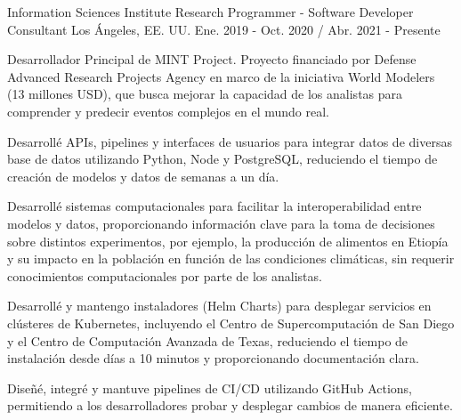 \begin{cventries}

  \cventry
    {Information Sciences Institute}
    {Research Programmer - Software Developer Consultant}
    {Los Ángeles, EE. UU.}
    {Ene. 2019 - Oct. 2020 / Abr. 2021 - Presente}
    {
      \begin{cvitems}
        \item{Desarrollador Principal de MINT Project. Proyecto financiado por Defense Advanced Research Projects Agency en marco de la iniciativa World Modelers (13 millones USD), que busca mejorar la capacidad de los analistas para comprender y predecir eventos complejos en el mundo real.}
        \item{Desarrollé APIs, pipelines y interfaces de usuarios para integrar datos de diversas base de datos utilizando Python, Node y PostgreSQL, reduciendo el tiempo de creación de modelos y datos de semanas a un día.}
        \item{Desarrollé sistemas computacionales para facilitar la interoperabilidad entre modelos y datos, proporcionando información clave para la toma de decisiones sobre distintos experimentos, por ejemplo, la producción de alimentos en Etiopía y su impacto en la población en función de las condiciones climáticas, sin requerir conocimientos computacionales por parte de los analistas.}
        \item{Desarrollé y mantengo instaladores (Helm Charts) para desplegar servicios en clústeres de Kubernetes, incluyendo el Centro de Supercomputación de San Diego y el Centro de Computación Avanzada de Texas, reduciendo el tiempo de instalación desde días a 10 minutos y proporcionando documentación clara.}
        \item{Diseñé, integré y mantuve pipelines de CI/CD utilizando GitHub Actions, permitiendo a los desarrolladores probar y desplegar cambios de manera eficiente.}
      \end{cvitems}
    }


\end{cventries}
